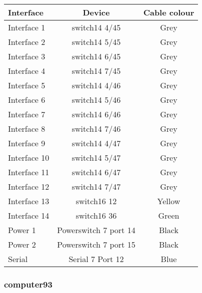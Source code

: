 \begin{table}[H]
\begin{tabular}{|l|c|c|}\hline
Interface & Device & Cable colour \\ \hline
Interface 1 & switch14 4/45 & Grey \\
Interface 2 & switch14 5/45 & Grey \\
Interface 3 & switch14 6/45 & Grey \\
Interface 4 & switch14 7/45 & Grey \\
Interface 5 & switch14 4/46 & Grey \\
Interface 6 & switch14 5/46 & Grey \\
Interface 7 & switch14 6/46 & Grey \\
Interface 8 & switch14 7/46 & Grey \\
Interface 9 & switch14 4/47 & Grey \\
Interface 10 & switch14 5/47 & Grey \\
Interface 11 & switch14 6/47 & Grey \\
Interface 12 & switch14 7/47 & Grey \\
Interface 13 & switch16 12 & Yellow \\
Interface 14 & switch16 36 & Green \\
Power 1 & Powerswitch 7 port 14 & Black \\
Power 2 & Powerswitch 7 port 15 & Black \\
Serial & Serial 7 Port 12 & Blue \\ \hline
\end{tabular}
\end{table}



\subsubsection{computer93}

